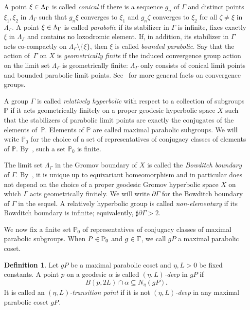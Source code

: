 \documentclass[10pt]{amsart}
\theoremstyle{definition}\newtheorem{defi}[theo]{Definition}\newtheorem{rema}[theo]{Remark}\newtheorem{exam}[theo]{Example}\newtheorem{exem}[theo]{Example}\newtheorem{nota}[theo]{Notation}
\newcommand{\bbP}{\mathbb{P}}
\let\oldin\in
\renewcommand{\in}{\mathchoice{\oldin}{\oldin}{\,\oldin\,}{\,\oldin\,}}
\begin{document}
A point $\xi\in \Lambda_\Gamma$ is called \emph{conical} if there is a sequence $g_{n}$ of $\Gamma$ and distinct points $\xi_1,\xi_2$ in $\Lambda_\Gamma$ such that $g_{n}\xi$ converges to $\xi_1$ and $g_{n}\zeta$ converges to $\xi_2$ for all $\zeta\neq \xi$ in~$\Lambda_\Gamma$. A point $\xi\in \Lambda_\Gamma$ is called \emph{parabolic} if its stabilizer in $\Gamma$ is infinite, fixes exactly $\xi$ in $\Lambda_\Gamma$ and contains no loxodromic element. If, in addition, its stabilizer in $\Gamma$ acts co-compactly on $\Lambda_\Gamma \setminus \{\xi\}$, then $\xi$ is called \emph{bounded parabolic}. Say that the action of~$\Gamma$ on $X$ is \emph{geometrically finite} if the induced convergence group action on the limit set $\Lambda_
\Gamma$ is geometrically finite: $\Lambda_
\Gamma$ only consists of conical limit points and bounded parabolic limit points. See~\cite{Bo99} for more general facts on convergence groups.


A group $\Gamma$ is called \emph{relatively hyperbolic} with respect to a collection of subgroups~$\bbP$ if it acts geometrically finitely on a proper geodesic hyperbolic space $X$ such that the stabilizers of parabolic limit points are exactly the conjugates of the elements of~$\bbP$. Elements of $\bbP$ are called maximal parabolic subgroups. We will write $\bbP_0$ for the choice of a set of representatives of conjugacy classes of elements of $\bbP$. By~\cite[Proposition~6.15]{Bowditch}, such a set $\bbP_0$ is finite.

The limit set $\Lambda_\Gamma$ in the Gromov boundary of $X$ is called the \emph{Bowditch boundary} of $\Gamma$. By~\cite[Theorem~9.4]{Bowditch}, it is unique up to equivariant homeomorphism and in particular does not depend on the choice of a proper geodesic Gromov hyperbolic space $X$ on which $\Gamma$ acts geometrically finitely. We will write $\partial\Gamma$ for the Bowditch boundary of $\Gamma$ in the sequel. A relatively hyperbolic group is called \emph{non-elementary} if its Bowditch boundary is infinite; equivalently, $\sharp \partial\Gamma>2$.


We now fix a finite set $\bbP_0$ of representatives of conjugacy classes of maximal parabolic subgroups. When $P\in \bbP_0$ and $g\in \Gamma$, we call $gP$ a maximal parabolic coset.
\begin{defi}
Let $gP$ be a maximal parabolic coset and $\eta, L>0$ be fixed constants. A point $p$ on a geodesic $\alpha$ is called \emph{$(\eta, L)$-deep} in $gP$ if
\[
B(p, 2L)\cap \alpha\subseteq N_\eta(gP).
\]
It is called an \emph{$(\eta, L)$-transition point} if it is not \emph{$(\eta, L)$-deep} in any maximal parabolic coset $gP$.
\end{defi}
\end{document}
